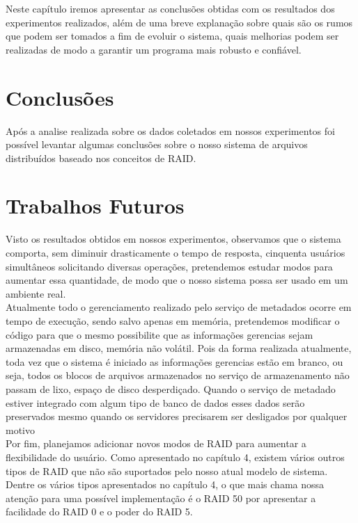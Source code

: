 Neste capítulo iremos apresentar as conclusões obtidas com os resultados dos experimentos realizados, além de uma breve explanação sobre quais são os rumos que podem ser tomados a fim de evoluir o sistema, quais melhorias podem ser realizadas de modo a garantir um programa mais robusto e confiável.
\\

\section{Conclusões}
Após a analise realizada sobre os dados coletados em nossos experimentos foi possível levantar algumas conclusões sobre o nosso sistema de arquivos distribuídos baseado nos conceitos de RAID.


\section{Trabalhos Futuros}
Visto os resultados obtidos em nossos experimentos, observamos que o sistema comporta, sem diminuir drasticamente o tempo de resposta, cinquenta usuários simultâneos  solicitando diversas operações, pretendemos estudar modos para aumentar essa quantidade, de modo que o nosso sistema possa ser usado em um ambiente real.
\\

Atualmente todo o gerenciamento realizado pelo serviço de metadados ocorre em tempo de execução, sendo salvo apenas em memória, pretendemos modificar o código para que o mesmo possibilite que as informações gerencias sejam armazenadas em disco, memória não volátil. Pois da forma realizada atualmente, toda vez que o sistema é iniciado as informações gerencias estão em branco, ou seja, todos os blocos de arquivos armazenados no serviço de armazenamento não passam de lixo, espaço de disco desperdiçado. Quando o serviço de metadado estiver integrado com algum tipo de banco de dados esses dados serão preservados mesmo quando os servidores precisarem ser desligados por qualquer motivo
\\

Por fim, planejamos adicionar novos modos de RAID para aumentar a flexibilidade do usuário. Como apresentado no capítulo 4, existem vários outros tipos de RAID que não são suportados pelo nosso atual modelo de sistema. Dentre os vários tipos apresentados no capítulo 4, o que mais chama nossa atenção para uma possível implementação é o RAID 50 por apresentar a facilidade do RAID 0 e o poder do RAID 5.
\\